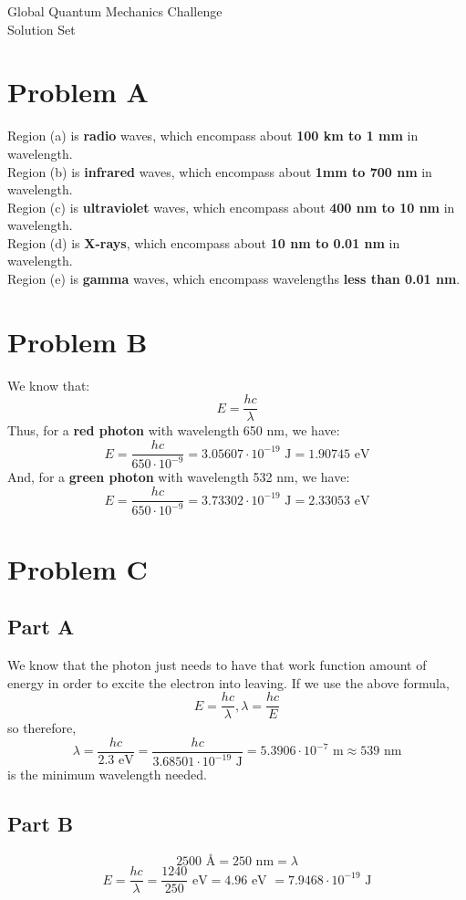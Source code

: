 \documentclass{article}
\begin{document}
\thispagestyle{fancy}
\begin{center}\LARGE{Global Quantum Mechanics Challenge \\ Solution Set}\end{center}
\section{Problem A}
Region (a) is \textbf{radio} waves, which encompass about \textbf{100 km to 1 mm} in wavelength.\\
Region (b) is \textbf{infrared} waves, which encompass about\textbf{ 1mm to 700 nm }in wavelength.\\
Region (c) is \textbf{ultraviolet} waves, which encompass about \textbf{400 nm to 10 nm} in wavelength.\\
Region (d) is \textbf{X-rays}, which encompass about \textbf{10 nm to 0.01 nm} in wavelength.\\
Region (e) is \textbf{gamma} waves, which encompass wavelengths \textbf{less than 0.01 nm}.
\section{Problem B}
We know that:
\[E = \frac{h c}{\lambda}\]
Thus, for a \textbf{red photon} with wavelength 650 nm, we have:
\[E = \frac{hc}{650 \cdot 10^{-9}} = 3.05607 \cdot 10^{-19} \text{ J}= \boxed{1.90745 \text{ eV}}\]
And, for a \textbf{green photon} with wavelength 532 nm, we have:
\[E = \frac{hc}{650 \cdot 10^{-9}} = 3.73302 \cdot 10^{-19} \text{ J} = \boxed{2.33053 \text{ eV}}\]
\section{Problem C}
\subsection{Part A}
We know that the photon just needs to have that work function amount of energy in order to excite the electron into leaving. If we use the above formula, 
\[E = \frac{h c}{\lambda}, \lambda = \frac{hc}{E}\]
so therefore,
\[\lambda = \frac{hc}{2.3 \text{ eV}} = \frac{hc}{3.68501\cdot10^{-19} \text{ J}} = 5.3906 \cdot 10^{-7} \text{ m} \approx \boxed{539 \text{ nm}}\]
is the minimum wavelength needed.
\subsection{Part B}
\[2500 \text{ Å} = 250 \text{ nm} = \lambda\]
\[E = \frac{hc}{\lambda} = \frac{1240}{250} \text{ eV} = \boxed{4.96 \text{ eV } = 7.9468\cdot 10^{-19} \text{ J}}\]
\end{document}

